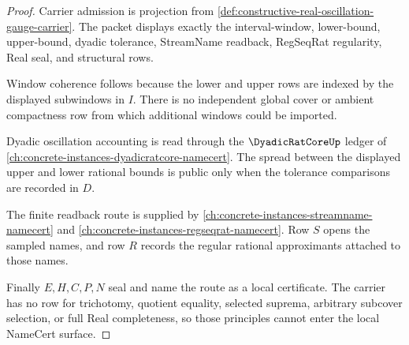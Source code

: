 \begin{proof}
Carrier admission is projection from \autoref{def:constructive-real-oscillation-gauge-carrier}. The packet displays exactly the interval-window, lower-bound, upper-bound, dyadic tolerance, StreamName readback, RegSeqRat regularity, Real seal, and structural rows.

Window coherence follows because the lower and upper rows are indexed by the displayed subwindows in $I$. There is no independent global cover or ambient compactness row from which additional windows could be imported.

Dyadic oscillation accounting is read through the $\DyadicRatCoreUp$ ledger of \autoref{ch:concrete-instances-dyadicratcore-namecert}. The spread between the displayed upper and lower rational bounds is public only when the tolerance comparisons are recorded in $D$.

The finite readback route is supplied by \autoref{ch:concrete-instances-streamname-namecert} and \autoref{ch:concrete-instances-regseqrat-namecert}. Row $S$ opens the sampled names, and row $R$ records the regular rational approximants attached to those names.

Finally $E,H,C,P,N$ seal and name the route as a local certificate. The carrier has no row for trichotomy, quotient equality, selected suprema, arbitrary subcover selection, or full Real completeness, so those principles cannot enter the local NameCert surface.
\end{proof}

